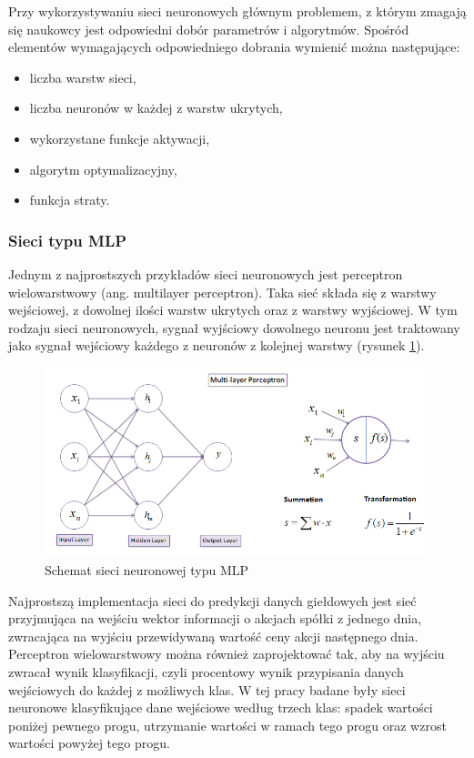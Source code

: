 \documentclass[a4paper, twoside, 11pt, openright]{article}
\begin{document}
\bigskip

Przy wykorzystywaniu sieci neuronowych głównym problemem, z którym zmagają się naukowcy jest odpowiedni dobór parametrów i algorytmów. Spośród elementów wymagających odpowiedniego dobrania wymienić można następujące:
\begin{itemize}
\item liczba warstw sieci,
\item liczba neuronów w każdej z warstw ukrytych,
\item wykorzystane funkcje aktywacji,
\item algorytm optymalizacyjny,
\item funkcja straty.
\end{itemize}


\subsubsection{Sieci typu MLP \cite{mlp}}

Jednym z najprostszych przykładów sieci neuronowych jest perceptron wielowarstwowy (ang. multilayer perceptron). Taka sieć składa się z warstwy wejściowej, z dowolnej ilości warstw ukrytych oraz z warstwy wyjściowej. W tym rodzaju sieci neuronowych, sygnał wyjściowy dowolnego neuronu jest traktowany jako sygnał wejściowy każdego z neuronów z kolejnej warstwy (rysunek \ref{neural-net}). 

\bigskip

\begin{figure}[H]
\centering \includegraphics[scale=0.7]{img/nn.png}
\caption{Schemat sieci neuronowej typu MLP \cite{mlpnn}}
\label{neural-net}
\end{figure}

Najprostszą implementacja sieci do predykcji danych giełdowych jest sieć przyjmująca na wejściu wektor informacji o akcjach spółki z jednego dnia, zwracająca na wyjściu przewidywaną wartość ceny akcji następnego dnia. Perceptron wielowarstwowy można również zaprojektować tak, aby na wyjściu zwracał wynik klasyfikacji, czyli procentowy wynik przypisania danych wejściowych do każdej z możliwych klas. W tej pracy badane były sieci neuronowe klasyfikujące dane wejściowe według trzech klas: spadek wartości poniżej pewnego progu, utrzymanie wartości w ramach tego progu oraz wzrost wartości powyżej tego progu. 
\end{document}
